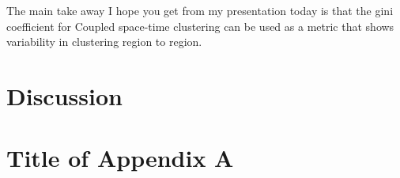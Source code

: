 \documentclass[12pt]{article} %
\theoremstyle{plain}
\begin{document}
The main take away I hope you get from my presentation today is  that the gini coefficient for Coupled space-time clustering can be used as a metric that shows variability in clustering region to region. 











	
	\section{Discussion}
	\label{sec:discuss}
	
	\appendix
	\section{Title of Appendix A}
	
\end{document}
